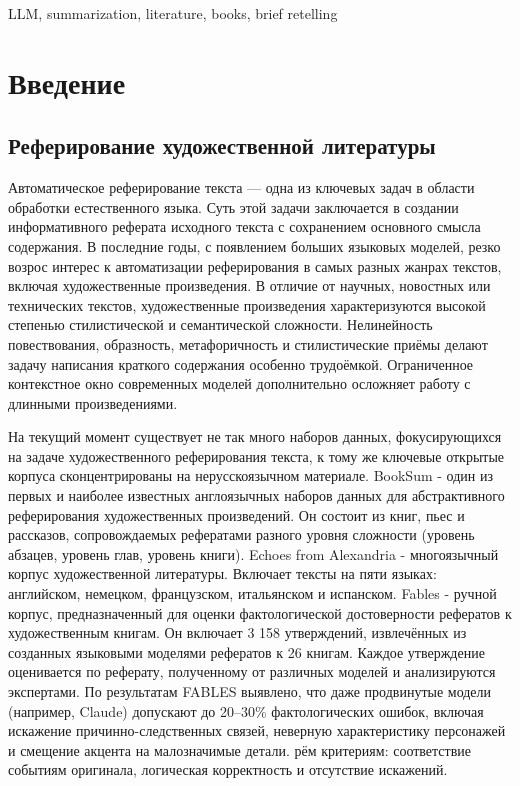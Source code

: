 \documentclass{article}
\begin{document}
\begin{altkeywords}
LLM, summarization, literature, books, brief retelling
\end{altkeywords}


\section*{Введение}
\subsection*{Реферирование художественной литературы}
Автоматическое реферирование текста — одна из ключевых задач в области обработки естественного языка. Суть этой задачи заключается в создании информативного реферата исходного текста с сохранением основного смысла содержания. 
В последние годы, с появлением больших языковых моделей, резко возрос интерес к автоматизации реферирования в самых разных жанрах текстов, включая художественные произведения. 
В отличие от научных, новостных или технических текстов, художественные произведения характеризуются высокой степенью стилистической и семантической сложности. 
Нелинейность повествования, образность, метафоричность и стилистические приёмы делают задачу написания краткого содержания особенно трудоёмкой. 
Ограниченное контекстное окно современных моделей дополнительно осложняет работу с длинными произведениями.

На текущий момент существует не так много наборов данных, фокусирующихся на задаче художественного реферирования текста, 
к тому же ключевые открытые корпуса сконцентрированы на нерусскоязычном материале. BookSum \cite{BookSum} - один из первых и наиболее известных англоязычных наборов данных
для абстрактивного реферирования художественных произведений. Он состоит из книг, пьес и рассказов, сопровождаемых рефератами разного уровня сложности (уровень абзацев, 
уровень глав, уровень книги). 
Echoes from Alexandria \cite{alexandria} - многоязычный корпус художественной литературы. Включает тексты на пяти языках: английском, немецком, французском, итальянском и испанском.
Fables \cite{fables} - ручной корпус, предназначенный для оценки фактологической достоверности рефератов к художественным книгам. 
Он включает 3 158 утверждений, извлечённых из созданных языковыми моделями рефератов к 26 книгам.
Каждое утверждение оценивается по реферату, полученному от различных моделей и анализируются экспертами. 
По результатам FABLES выявлено, что даже продвинутые модели (например, Claude) допускают до 20–30\% фактологических ошибок, включая искажение
причинно-следственных связей, неверную характеристику персонажей и смещение
акцента на малозначимые детали.
рём критериям: соответствие событиям оригинала, логическая корректность и отсутствие искажений.
\end{document}
